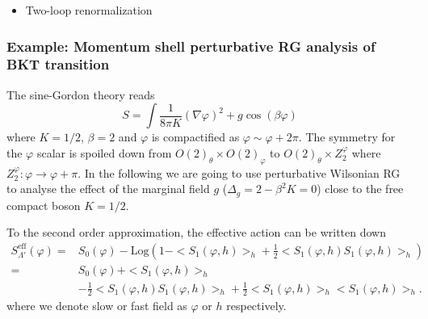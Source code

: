 \documentclass[submission, PhysLectNotes]{SciPost}
\begin{document}
\begin{itemize}
	\item Two-loop renormalization 
\end{itemize}



\subsubsection*{Example: Momentum shell perturbative RG analysis of BKT transition}
The sine-Gordon theory reads
\begin{equation}
S = \int \frac{1}{8 \pi  K}(\nabla \varphi )^2 + g \cos( \beta \varphi)
\end{equation}
where $K=1/2$, $\beta=2$ and $\varphi$ is compactified as $\varphi \sim \varphi + 2\pi$. The symmetry for the $\varphi$ scalar is spoiled down from $O(2)_\theta \times O(2)_\varphi$ to $O(2)_\theta \times Z_2^\varphi$ where $Z_2^\varphi : \varphi \rightarrow \varphi + \pi$. In the following we are going to use perturbative Wilsonian RG to analyse the effect of the marginal field $g$ ($\Delta_g =2 - \beta^2K = 0$) close to the free compact boson $K=1/2$.

To the second order approximation, the effective action can be written down 
\begin{equation}
	\begin{aligned}
		S_{\Lambda '}^{\text{eff}} ( \varphi  ) =& S_0(\varphi ) -\text{Log} \left( 1 - <S_1(\varphi ,h)>_h + \frac{1 }{2}<S_1(\varphi ,h)S_1(\varphi ,h)>_h \right) \\
		= &S_0(\varphi) + <S_1(\varphi ,h)>_h \\
		&- \frac{1}{2}<S_1(\varphi ,h)S_1(\varphi ,h)>_h + \frac{1}{2}<S_1(\varphi ,h)>_h<S_1(\varphi ,h)>_h.
	\end{aligned}
\end{equation}
where we denote slow or fast field as $\varphi$ or $h$ respectively. 
\end{document}
